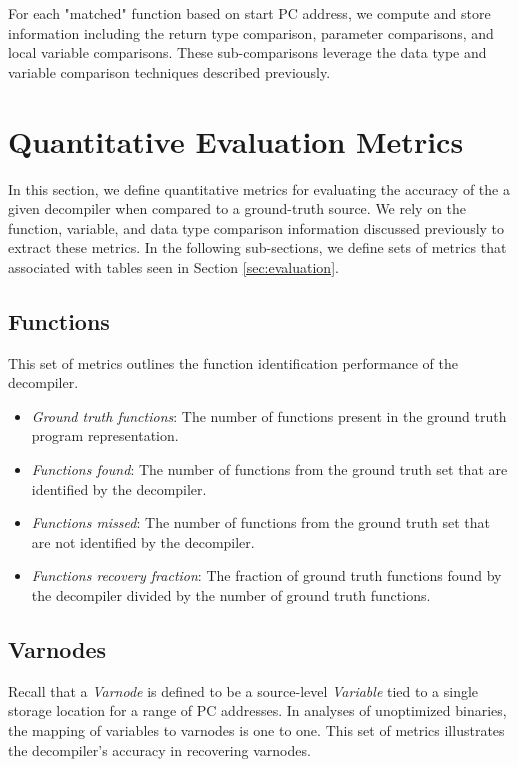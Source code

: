 For each "matched" function based on start PC address, we compute and store information including the return type comparison, parameter comparisons, and local variable comparisons. These sub-comparisons leverage the data type and variable comparison techniques described previously.

\section{Quantitative Evaluation Metrics}

In this section, we define quantitative metrics for evaluating the accuracy of the a given decompiler when compared to a ground-truth source. We rely on the function, variable, and data type comparison information discussed previously to extract these metrics. In the following sub-sections, we define sets of metrics that associated with tables seen in Section \ref{sec:evaluation}.

\subsection{Functions}

This set of metrics outlines the function identification performance of the decompiler.

\begin{itemize}
    \item \emph{Ground truth functions}: The number of functions present in the ground truth program representation.
    \item \emph{Functions found}: The number of functions from the ground truth set that are identified by the decompiler.
    \item \emph{Functions missed}: The number of functions from the ground truth set that are not identified by the decompiler.
    \item \emph{Functions recovery fraction}: The fraction of ground truth functions found by the decompiler divided by the number of ground truth functions.
\end{itemize}

\subsection{Varnodes}

Recall that a \emph{Varnode} is defined to be a source-level \emph{Variable} tied to a single storage location for a range of PC addresses. In analyses of unoptimized binaries, the mapping of variables to varnodes is one to one. This set of metrics illustrates the decompiler's accuracy in recovering varnodes.

